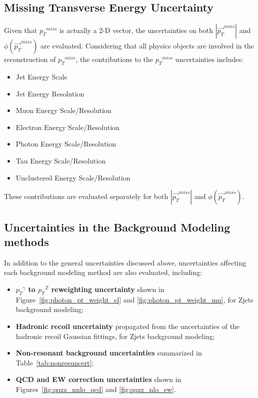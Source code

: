 \subsection{Missing Transverse Energy Uncertainty}
Given that ${p_{T}}^{miss}$ is actually a 2-D vector, the uncertainties on both $|{\vec{p_{T}}^{miss}}|$ and $\phi({\vec{p_{T}}}^{miss})$ are evaluated. Considering that all physics objects are involved in the reconstruction of ${p_{T}}^{miss}$, the contributions to the ${p_{T}}^{miss}$ uncertainties includes:
\begin{itemize}
\item Jet Energy Scale
\item Jet Energy Resolution
\item Muon Energy Scale/Resolution
\item Electron Energy Scale/Resolution
\item Photon Energy Scale/Resolution
\item Tau Energy Scale/Resolution
\item Unclustered Energy Scale/Resolution
\end{itemize}

These contributions are evaluated separately for both $|{\vec{p_{T}}^{miss}}|$ and $\phi({\vec{p_{T}}}^{miss})$.
\subsection{Uncertainties in the Background Modeling methods}
In addition to the general uncertainties discussed above, uncertainties affecting each background modeling method are also evaluated, including:
\begin{itemize}
\item \textbf{${p_T}^{\gamma}$ to ${p_T}^Z$ reweighting uncertainty} shown in Figure~\ref{fig:photon_pt_weight_el} and \ref{fig:photon_pt_weight_mu}, for Zjets background modeling;
\item \textbf{Hadronic recoil uncertainty} propagated from the uncertainties of the hadronic recoil Gaussian fittings, for Zjets background modeling;
\item \textbf{Non-resonant background uncertainties} summarized in Table~\ref{tab:nonresuncert};
\item \textbf{QCD and EW correction uncertainties} shown in Figures~\ref{fig:qqzz_nnlo_qcd} and \ref{fig:qqzz_nlo_ew}.
\end{itemize}

